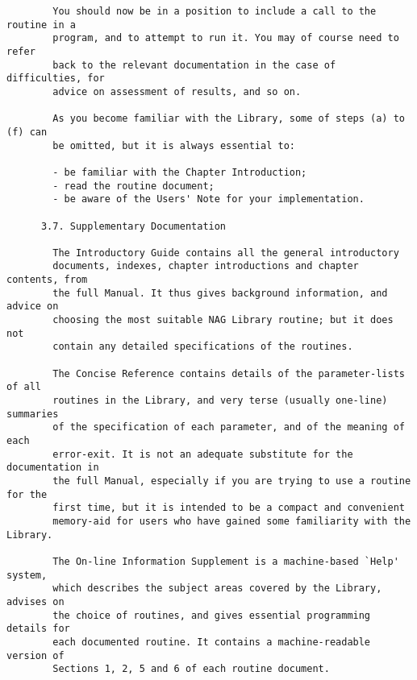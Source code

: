 \begin{small}
\begin{verbatim}
        You should now be in a position to include a call to the routine in a     
        program, and to attempt to run it. You may of course need to refer        
        back to the relevant documentation in the case of difficulties, for       
        advice on assessment of results, and so on.                               
                                                                                  
        As you become familiar with the Library, some of steps (a) to (f) can     
        be omitted, but it is always essential to:                                
                                                                                  
        - be familiar with the Chapter Introduction;                              
        - read the routine document;                                              
        - be aware of the Users' Note for your implementation.                    
                                                                                  
      3.7. Supplementary Documentation                                            
                                                                                  
        The Introductory Guide contains all the general introductory              
        documents, indexes, chapter introductions and chapter contents, from      
        the full Manual. It thus gives background information, and advice on      
        choosing the most suitable NAG Library routine; but it does not           
        contain any detailed specifications of the routines.                      
                                                                                  
        The Concise Reference contains details of the parameter-lists of all      
        routines in the Library, and very terse (usually one-line) summaries      
        of the specification of each parameter, and of the meaning of each        
        error-exit. It is not an adequate substitute for the documentation in     
        the full Manual, especially if you are trying to use a routine for the    
        first time, but it is intended to be a compact and convenient             
        memory-aid for users who have gained some familiarity with the Library.   
                                                                                  
        The On-line Information Supplement is a machine-based `Help' system,      
        which describes the subject areas covered by the Library, advises on      
        the choice of routines, and gives essential programming details for       
        each documented routine. It contains a machine-readable version of        
        Sections 1, 2, 5 and 6 of each routine document.                          
                                                                                  

\end{verbatim}
\end{small}
